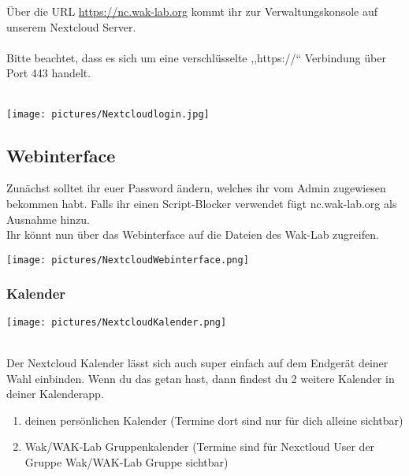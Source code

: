 Über die URL \url{https://nc.wak-lab.org} kommt ihr zur Verwaltungskonsole auf unserem Nextcloud Server. \\
\ \\
Bitte beachtet, dass es sich um eine verschlüsselte ,,https://`` Verbindung über Port 443 handelt.\\
\ \\
\begin{minipage}[t]{\textwidth}
  \centering
  \texttt{[image: pictures/Nextcloudlogin.jpg]}
  \label{img:Nextcloudlogin}
\end{minipage}

\subsection{Webinterface}
Zunächst solltet ihr euer Password ändern, welches ihr vom Admin zugewiesen bekommen habt. Falls ihr einen Script-Blocker verwendet fügt nc.wak-lab.org als Ausnahme hinzu.\\
Ihr könnt nun über das Webinterface auf die Dateien des Wak-Lab zugreifen.\\
 
\begin{minipage}[t]{\textwidth}
  \centering
  \texttt{[image: pictures/NextcloudWebinterface.png]}
  \label{img:NextcloudWebinterface}
\end{minipage}


\subsubsection{Kalender}
\begin{minipage}[t]{\textwidth}
  \centering
  \texttt{[image: pictures/NextcloudKalender.png]}
  \label{img:NextcloudKalender}
\end{minipage}
\ \\
Der Nextcloud Kalender lässt sich auch super einfach auf dem Endgerät deiner Wahl einbinden. Wenn du das getan hast, dann findest du 2 weitere Kalender in deiner Kalenderapp.\\
\begin{enumerate}
  \item deinen persönlichen Kalender (Termine dort sind nur für dich alleine sichtbar)
  \item Wak/WAK-Lab Gruppenkalender (Termine sind für Nexctloud User der Gruppe Wak/WAK-Lab Gruppe sichtbar)
\end{enumerate}

